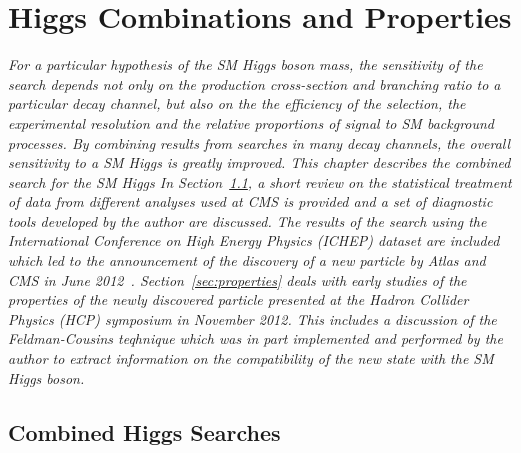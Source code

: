 \chapter{Higgs Combinations and Properties}
\label{chap:combinations}

\emph{For a particular hypothesis of the SM Higgs boson mass, the sensitivity 
of the search depends not only on the production cross-section and 
branching ratio to a particular decay channel, but also on the the efficiency
of the selection, the experimental resolution and the relative proportions of 
signal to SM background processes. By combining results from searches
in many decay channels, the overall sensitivity to a SM Higgs is greatly improved.
This chapter describes the combined search for the SM Higgs 
In Section~\ref{sec:combinationmethodology}, a short review on the statistical 
treatment of data from different analyses used at CMS is provided and a set of diagnostic
tools developed by the author are discussed.
The results of the search using the International Conference on
High Energy Physics (ICHEP) dataset are included 
which led to the announcement of the discovery of a new particle 
by Atlas and CMS in June 2012~\cite{HIG-12-028}. 
Section~\ref{sec:properties} deals with early studies of the 
properties of the newly discovered particle presented at the Hadron Collider Physics (HCP) 
symposium in November 2012. This includes a discussion of 
the Feldman-Cousins teqhnique which was in part implemented and performed
by the author to extract information on the compatibility of the new 
state with the SM Higgs boson.}

\section{Combined Higgs Searches}
\label{sec:combinationmethodology}

